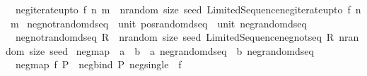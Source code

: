 \begin{isabellebody}
\isanewline
\ \ {\isachardoublequoteopen}neg{\isacharunderscore}{\kern0pt}iterate{\isacharunderscore}{\kern0pt}upto\ f\ n\ m\ {\isacharequal}{\kern0pt}\ {\isacharparenleft}{\kern0pt}{\isasymlambda}nrandom\ size\ seed{\isachardot}{\kern0pt}\ Limited{\isacharunderscore}{\kern0pt}Sequence{\isachardot}{\kern0pt}neg{\isacharunderscore}{\kern0pt}iterate{\isacharunderscore}{\kern0pt}upto\ f\ n\ m{\isacharparenright}{\kern0pt}{\isachardoublequoteclose}\isanewline
\isanewline
{}\isamarkupfalse%
\ neg{\isacharunderscore}{\kern0pt}not{\isacharunderscore}{\kern0pt}random{\isacharunderscore}{\kern0pt}dseq\ {\isacharcolon}{\kern0pt}{\isacharcolon}{\kern0pt}\ {\isachardoublequoteopen}unit\ pos{\isacharunderscore}{\kern0pt}random{\isacharunderscore}{\kern0pt}dseq\ {\isacharequal}{\kern0pt}{\isachargreater}{\kern0pt}\ unit\ neg{\isacharunderscore}{\kern0pt}random{\isacharunderscore}{\kern0pt}dseq{\isachardoublequoteclose}\isanewline
{}\isanewline
\ \ {\isachardoublequoteopen}neg{\isacharunderscore}{\kern0pt}not{\isacharunderscore}{\kern0pt}random{\isacharunderscore}{\kern0pt}dseq\ R\ {\isacharequal}{\kern0pt}\ {\isacharparenleft}{\kern0pt}{\isasymlambda}nrandom\ size\ seed{\isachardot}{\kern0pt}\ Limited{\isacharunderscore}{\kern0pt}Sequence{\isachardot}{\kern0pt}neg{\isacharunderscore}{\kern0pt}not{\isacharunderscore}{\kern0pt}seq\ {\isacharparenleft}{\kern0pt}R\ nrandom\ size\ seed{\isacharparenright}{\kern0pt}{\isacharparenright}{\kern0pt}{\isachardoublequoteclose}\isanewline
\isanewline
{}\isamarkupfalse%
\ neg{\isacharunderscore}{\kern0pt}map\ {\isacharcolon}{\kern0pt}{\isacharcolon}{\kern0pt}\ {\isachardoublequoteopen}{\isacharparenleft}{\kern0pt}{\isacharprime}{\kern0pt}a\ {\isacharequal}{\kern0pt}{\isachargreater}{\kern0pt}\ {\isacharprime}{\kern0pt}b{\isacharparenright}{\kern0pt}\ {\isacharequal}{\kern0pt}{\isachargreater}{\kern0pt}\ {\isacharprime}{\kern0pt}a\ neg{\isacharunderscore}{\kern0pt}random{\isacharunderscore}{\kern0pt}dseq\ {\isacharequal}{\kern0pt}{\isachargreater}{\kern0pt}\ {\isacharprime}{\kern0pt}b\ neg{\isacharunderscore}{\kern0pt}random{\isacharunderscore}{\kern0pt}dseq{\isachardoublequoteclose}\isanewline
{}\isanewline
\ \ {\isachardoublequoteopen}neg{\isacharunderscore}{\kern0pt}map\ f\ P\ {\isacharequal}{\kern0pt}\ neg{\isacharunderscore}{\kern0pt}bind\ P\ {\isacharparenleft}{\kern0pt}neg{\isacharunderscore}{\kern0pt}single\ {\isasymcirc}\ f{\isacharparenright}{\kern0pt}{\isachardoublequoteclose}\isanewline
\isanewline
{}\isamarkupfalse%

\end{isabellebody}
